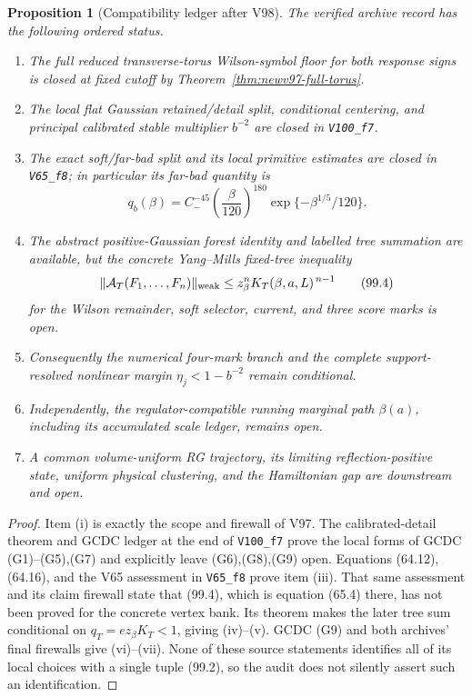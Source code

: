 \documentclass[11pt,oneside]{article}
\newtheorem{proposition}[theorem]{Proposition}
\theoremstyle{definition}
\theoremstyle{remark}
\begin{document}
\begin{proposition}[Compatibility ledger after V98]
\label{prop:newv99-ledger}
The verified archive record has the following ordered status.
\begin{enumerate}[label=\textup{(\roman*)},leftmargin=3.5em]
\item The full reduced transverse-torus Wilson-symbol floor for
      both response signs is closed at fixed cutoff by
      Theorem~\ref{thm:newv97-full-torus}.
\item The local flat Gaussian retained/detail split, conditional
      centering, and principal calibrated stable multiplier
      \(b^{-2}\) are closed in \texttt{V100\_f7}.
\item The exact soft/far-bad split and its local primitive
      estimates are closed in \texttt{V65\_f8}; in particular its
      far-bad quantity is
      \[
       q_b(\beta)=C_-^{-45}\left(\frac{\beta}{120}\right)^{180}
       \exp\{-\beta^{1/5}/120\}.                    \tag{99.3}
      \]
\item The abstract positive-Gaussian forest identity and labelled
      tree summation are available, but the concrete
      Yang--Mills fixed-tree inequality
      \[
       \|{\cal A}_T(F_1,\ldots,F_n)\|_{\rm weak}
       \le z_\beta^n K_T(\beta,a,L)^{\,n-1}          \tag{99.4}
      \]
      for the Wilson remainder, soft selector, current, and three
      score marks is open.
\item Consequently the numerical four-mark branch and the complete
      support-resolved nonlinear margin
      \(\eta_j<1-b^{-2}\) remain conditional.
\item Independently, the regulator-compatible running marginal
      path \(\beta(a)\), including its accumulated scale ledger,
      remains open.
\item A common volume-uniform RG trajectory, its limiting
      reflection-positive state, uniform physical clustering, and
      the Hamiltonian gap are downstream and open.
\end{enumerate}
\end{proposition}

\begin{proof}
Item (i) is exactly the scope and firewall of V97.  The
calibrated-detail theorem and GCDC ledger at the end of
\texttt{V100\_f7} prove the local forms of GCDC
\textup{(G1)--(G5),(G7)} and explicitly leave
\textup{(G6),(G8),(G9)} open.  Equations (64.12), (64.16), and the
V65 assessment in \texttt{V65\_f8} prove item (iii).  That same
assessment and its claim firewall state that (99.4), which is
equation (65.4) there, has not been proved for the concrete vertex
bank.  Its theorem makes the later tree sum conditional on
\(q_T=e z_\beta K_T<1\), giving (iv)--(v).  GCDC (G9) and both
archives' final firewalls give (vi)--(vii).  None of these source
statements identifies all of its local choices with a single tuple
(99.2), so the audit does not silently assert such an
identification.
\end{proof}
\end{document}
